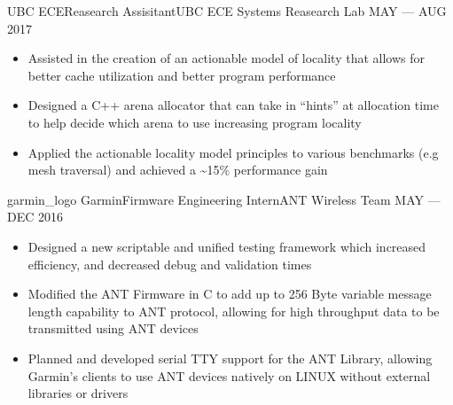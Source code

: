 \begin{experiences}
  \emptySeparator

    {UBC ECE}{Reasearch Assisitant}{UBC ECE Systems Reasearch Lab}
    {MAY --- AUG 2017}{
      \begin{itemize}
        \item Assisted in the creation of an actionable model of locality that allows for better
              cache utilization and better program performance
        \item Designed a C++ arena allocator that can take in “hints” at allocation time to help
              decide which arena to use increasing program locality
        \item Applied the actionable locality model principles to various benchmarks
              (e.g mesh traversal) and achieved a \~{}15\% performance gain
      \end{itemize}
    }

  \emptySeparator

  \experience
    {garmin_logo}
    {Garmin}{Firmware Engineering Intern}{ANT Wireless Team}
    {MAY --- DEC 2016}
    {
      \begin{itemize}
        \item Designed a new scriptable and unified testing framework which increased efficiency,
              and decreased debug and validation times
        \item Modified the ANT Firmware in C to add up to 256 Byte variable message length
              capability to ANT protocol, allowing for high throughput data to be transmitted using
              ANT devices
        \item Planned and developed serial TTY support for the ANT Library, allowing Garmin’s
              clients to use ANT devices natively on LINUX without external libraries or drivers
      \end{itemize}
    }

  \emptySeparator
\end{experiences}
